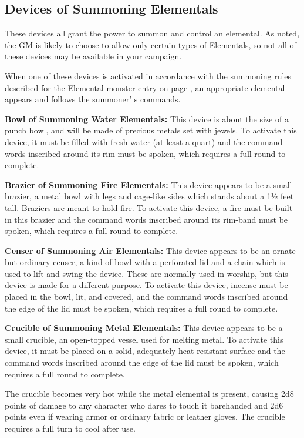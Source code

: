 \documentclass[a4paper,twoside,openany,10pt]{book}
\begin{document}
\begin{multicols}{2}
\subsection{Devices of Summoning Elementals}\label{devices-of-summoning-elementals-1}

These devices all grant the power to summon and control an elemental. As noted, the GM is likely to choose to allow only certain types of Elementals, so not all of these devices may be available in your campaign.

When one of these devices is activated in accordance with the summoning rules described for the Elemental monster entry on page \hyperlink{elemental}{\pageref{elemental}}, an appropriate elemental appears and follows the summoner' s commands.

\textbf{Bowl of Summoning Water Elementals:} This device is about the size of a punch bowl, and will be made of precious metals set with jewels. To activate this device, it must be filled with fresh water (at least a quart) and the command words inscribed around its rim must be spoken, which requires a full round to complete.

\textbf{Brazier of Summoning Fire Elementals:} This device appears to be a small brazier, a metal bowl with legs and cage-like sides which stands about a 1½ feet tall. Braziers are meant to hold fire. To activate this device, a fire must be built in this brazier and the command words inscribed around its rim-band must be spoken, which requires a full round to complete.

\textbf{Censer of Summoning Air Elementals:} This device appears to be an ornate but ordinary censer, a kind of bowl with a perforated lid and a chain which is used to lift and swing the device. These are normally used in worship, but this device is made for a different purpose. To activate this device, incense must be placed in the bowl, lit, and covered, and the command words inscribed around the edge of the lid must be spoken, which requires a full round to complete.

\textbf{Crucible of Summoning Metal Elementals:} This device appears to be a small crucible, an open-topped vessel used for melting metal. To activate this device, it must be placed on a solid, adequately heat-resistant surface and the command words inscribed around the edge of the lid must be spoken, which requires a full round to complete. 

The crucible becomes very hot while the metal elemental is present, causing 2d8 points of damage to any character who dares to touch it barehanded and 2d6 points even if wearing armor or ordinary fabric or leather gloves. The crucible requires a full turn to cool after use.


\end{multicols}
\end{document}
